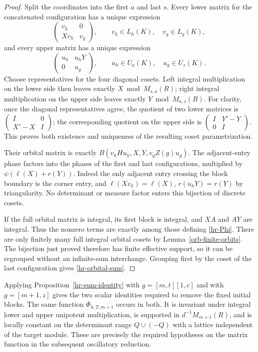 \begin{proof}
Split the coordinates into the first $a$ and last $s$.
Every lower matrix for the concatenated configuration has
a unique expression
\[
 \begin{pmatrix}v_h&0\\Xv_h&v_g\end{pmatrix},
 \qquad v_h\in L_h(K),\quad v_g\in L_g(K),
\]
and every upper matrix has a unique expression
\[
 \begin{pmatrix}u_h&u_hY\\0&u_g\end{pmatrix},
 \qquad u_h\in U_a(K),\quad u_g\in U_s(K).
\]
Choose representatives for the four diagonal cosets. Left
integral multiplication on the lower side then leaves exactly
$X\bmod M_{s,a}(R)$; right integral multiplication on the
upper side leaves exactly $Y\bmod M_{a,s}(R)$.
For clarity, once the diagonal representatives agree, the
quotient of two lower matrices is
$\left(\begin{smallmatrix}I&0\\X'-X&I\end{smallmatrix}\right)$;
the corresponding quotient on the upper side is
$\left(\begin{smallmatrix}I&Y'-Y\\0&I\end{smallmatrix}\right)$.
This proves both existence and uniqueness of the resulting
coset parametrization.

Their orbital matrix is exactly
$B(v_hHu_h,X,Y,v_gZ(g)u_g)$.
The adjacent-entry phase factors into the phases of the first
and last configurations, multiplied by
$\psi(\ell(X)+r(Y))$. Indeed the only adjacent entry crossing
the block boundary is the corner entry, and
$\ell(Xv_h)=\ell(X)$, $r(u_hY)=r(Y)$ by triangularity.
No determinant or measure factor enters this bijection of
discrete cosets.

If the full orbital matrix is integral, its first block is
integral, and $XA$ and $AY$ are integral. Thus the nonzero
terms are exactly among those defining \eqref{hr-Phi}.
There are only finitely many full integral orbital cosets by
Lemma~\ref{orb-finite-orbits}. The bijection just proved
therefore has finite effective support, so it can be regrouped
without an infinite-sum interchange. Grouping first by the
coset of the last configuration gives
\eqref{hr-orbital-sum}.
\end{proof}

Applying Proposition~\ref{hr-sum-identity} with
$g=[m,t][1,c]$ and with $g=[m+1,z]$ gives the two scalar
identities required to remove the fixed initial blocks. The
same function $\Phi_{h,T,m+1}$ occurs in both. It is invariant
under integral lower and upper unipotent multiplication, is
supported in $d^{-1}M_{m+1}(R)$, and is locally constant on
the determinant range $Q\cup(-Q)$ with a lattice independent
of the target module. These are precisely the required
hypotheses on the matrix function in the subsequent
oscillatory reduction.

